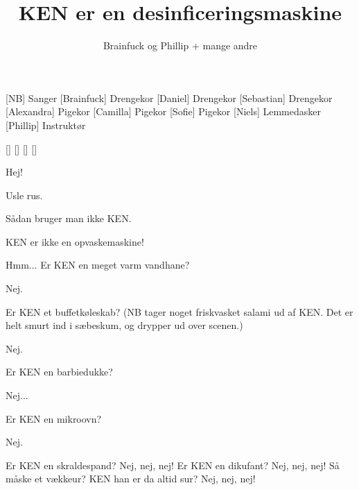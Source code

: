 \documentclass[a4paper,11pt]{article}
\title{KEN er en desinficeringsmaskine}
\author{Brainfuck og Phillip + mange andre}
\begin{document}
\maketitle

\begin{roles}
[NB] Sanger
[Brainfuck] Drengekor
[Daniel] Drengekor
[Sebastian] Drengekor
[Alexandra] Pigekor
[Camilla] Pigekor
[Sofie] Pigekor
[Niels] Lemmedasker
[Phillip] Instruktør
\end{roles}

\begin{props}
[]
[]
[]
[]
\end{props}

\begin{song}
%


 Hej!

 Usle rus.

 Sådan bruger man ikke KEN.

 KEN er ikke en opvaskemaskine!

 Hmm...
Er KEN en meget varm vandhane?

 Nej.

 Er KEN et buffetkøleskab? (NB tager noget friskvasket salami ud af KEN. Det er helt smurt ind i sæbeskum, og drypper ud over scenen.)

 Nej.

 Er KEN en barbiedukke?

 Nej...

 Er KEN en mikroovn?


 Nej.


 Er KEN en skraldespand? 
 Nej, nej, nej! 
 Er KEN en dikufant? 
 Nej, nej, nej! 
 Så måske et vækkeur? 
 KEN han er da altid sur?
 Nej, nej, nej! 


\end{song}
\end{document}
